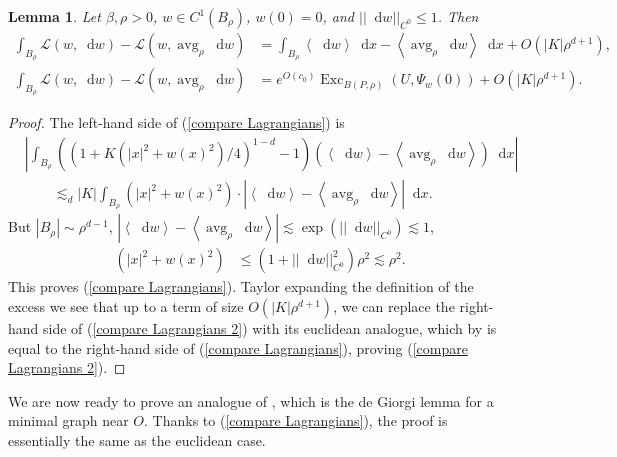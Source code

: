 \documentclass[reqno,10pt]{amsart}
\DeclareMathOperator{\avg}{avg}
\DeclareMathOperator{\Exc}{Exc}
\newcommand*\dif{\mathop{}\!\mathrm{d}}
\newcommand{\Lagrange}{\mathscr L}
\def\Japan#1{\left \langle #1 \right \rangle}
\newtheorem{lemma}[theorem]{Lemma}
\theoremstyle{definition}
\numberwithin{equation}{section}
\begin{document}
\begin{lemma}
Let $\beta, \rho > 0$, $w \in C^1(B_\rho)$, $w(0) = 0$, and $||\dif w||_{C^0} \leq 1$. Then
\begin{align}
\int_{B_\rho} \Lagrange(w, \dif w) - \Lagrange(w, \avg_\rho \dif w) &= \int_{B_\rho} \Japan{\dif w} \dif x - \Japan{\avg_\rho \dif w} \dif x + O(|K| \rho^{d + 1}) \label{compare Lagrangians}, \\
\int_{B_\rho} \Lagrange(w, \dif w) - \Lagrange(w, \avg_\rho \dif w) &= e^{O(c_0)} \Exc_{B(P, \rho)} (U, \Psi_w(0)) + O(|K| \rho^{d + 1}). \label{compare Lagrangians 2}
\end{align}
\end{lemma}
\begin{proof}
The left-hand side of (\ref{compare Lagrangians}) is
\begin{align*}
&\left|\int_{B_\rho} ((1 + K(|x|^2 + w(x)^2)/4)^{1 - d} - 1)(\Japan{\dif w} - \Japan{\avg_\rho \dif w}) \dif x\right| \\
&\qquad \lesssim_d |K| \int_{B_\rho} (|x|^2 + w(x)^2) \cdot \left|\Japan{\dif w} - \Japan{\avg_\rho \dif w}\right| \dif x.
\end{align*}
But $|B_\rho| \sim \rho^{d - 1}$, $|\Japan{\dif w} - \Japan{\avg_\rho \dif w}| \lesssim \exp(||\dif w||_{C^0}) \lesssim 1$,
\begin{align*}
(|x|^2 + w(x)^2) &\leq (1 + ||\dif w||_{C^0}^2) \rho^2 \lesssim \rho^2.
\end{align*}
This proves (\ref{compare Lagrangians}). Taylor expanding the definition of the excess we see that up to a term of size $O(|K| \rho^{d + 1})$, we can replace the right-hand side of (\ref{compare Lagrangians 2}) with its euclidean analogue, which by \cite[pg83]{Giusti77} is equal to the right-hand side of (\ref{compare Lagrangians}), proving (\ref{compare Lagrangians 2}).
\end{proof}

We are now ready to prove an analogue of \cite[Lemma 6.3]{Giusti77}, which is the de Giorgi lemma for a minimal graph near $O$.
Thanks to (\ref{compare Lagrangians}), the proof is essentially the same as the euclidean case.
\end{document}
